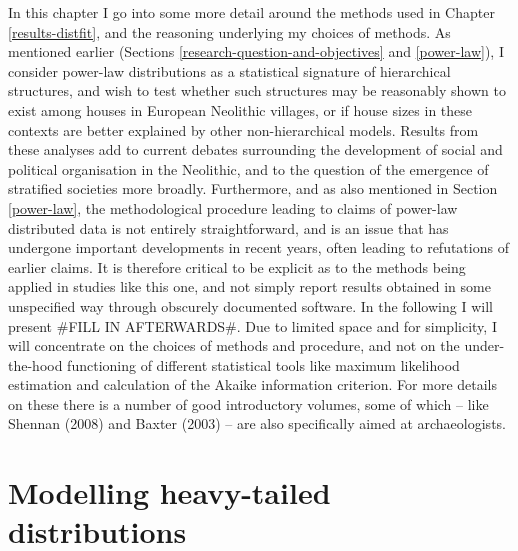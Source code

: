 \documentclass[
  12pt,
]{book}
\begin{document}
In this chapter I go into some more detail around the methods used in Chapter \ref{results-distfit}, and the reasoning underlying my choices of methods. As mentioned earlier (Sections \ref{research-question-and-objectives} and \ref{power-law}), I consider power-law distributions as a statistical signature of hierarchical structures, and wish to test whether such structures may be reasonably shown to exist among houses in European Neolithic villages, or if house sizes in these contexts are better explained by other non-hierarchical models. Results from these analyses add to current debates surrounding the development of social and political organisation in the Neolithic, and to the question of the emergence of stratified societies more broadly. Furthermore, and as also mentioned in Section \ref{power-law}, the methodological procedure leading to claims of power-law distributed data is not entirely straightforward, and is an issue that has undergone important developments in recent years, often leading to refutations of earlier claims. It is therefore critical to be explicit as to the methods being applied in studies like this one, and not simply report results obtained in some unspecified way through obscurely documented software. In the following I will present \#FILL IN AFTERWARDS\#. Due to limited space and for simplicity, I will concentrate on the choices of methods and procedure, and not on the under-the-hood functioning of different statistical tools like maximum likelihood estimation and calculation of the Akaike information criterion. For more details on these there is a number of good introductory volumes, some of which -- like Shennan (2008) and Baxter (2003) -- are also specifically aimed at archaeologists.

\hypertarget{modelling-heavy-tailed-distributions}{%
\section{Modelling heavy-tailed distributions}\label{modelling-heavy-tailed-distributions}}
\end{document}

